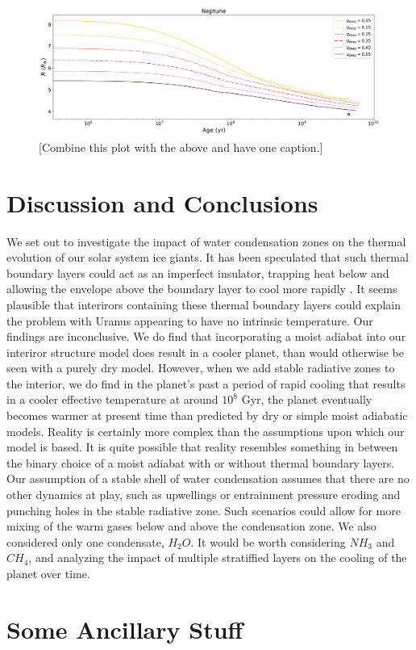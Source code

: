 \documentclass[11pt]{ucscthesisbs}
\begin{document}
\begin{figure}[ht]
 \centerline{
  \includegraphics[scale=0.45]{figures/n_cooling_radius_nz_4096_logx.png}
 }
\caption[Thermal Evolution Curves for Neptune - Radius]
{[Combine this plot with the above and have one caption.] }
\label{fig:evolve_neptune_radius}
\end{figure}



\chapter{Discussion and Conclusions}
We set out to investigate the impact of water condensation zones on the thermal evolution of our solar system ice giants. It has been speculated that such thermal boundary layers could act as an imperfect insulator, trapping heat below and allowing the envelope above the boundary layer to cool more rapidly \citep{nettelmann_2016}\citep{friedson_2017}\citep{leconte_2017}\citep{podolak_1991}\citep{scheibe_2019}. It seems plausible that interirors containing these thermal boundary layers could explain the problem with Uranus appearing to have no intrinsic temperature. Our findings are inconclusive. We do find that incorporating a moist adiabat into our interiror structure model does result in a cooler planet, than would otherwise be seen with a purely dry model. However, when we add stable radiative zones to the interior, we do find in the planet's past a period of rapid cooling that results in a cooler effective temperature at around $10^8$ Gyr, the planet eventually becomes warmer at present time than predicted by dry or simple moist adiabatic models. Reality is certainly more complex than the assumptions upon which our model is based. It is quite possible that reality resembles something in between the binary choice of a moist adiabat with or without thermal boundary layers\citep{guillot_2019}. Our assumption of a stable shell of water condensation assumes that there are no other dynamics at play, such as upwellings or entrainment pressure \citep{friedson_2017} eroding and punching holes in the stable radiative zone. Such scenarios could allow for more mixing of the warm gases below and above the condensation zone. We also considered only one condensate, $H_{2}O$. It would be worth considering $NH_{3}$ and $CH_{4}$, and analyzing the impact of multiple stratiffied layers on the cooling of the planet over time.



\appendix
\chapter{Some Ancillary Stuff}

\newcommand{\newblock}{}

\end{document}
